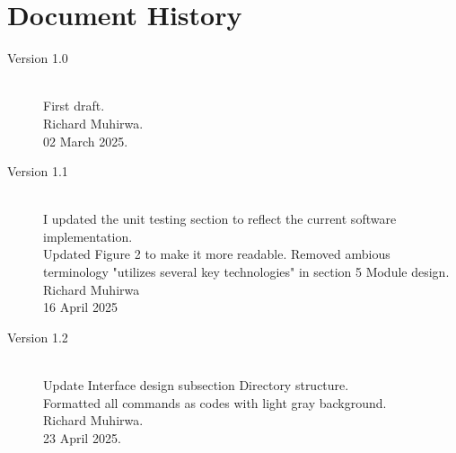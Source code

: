 \documentclass{CSSRforAfrica}
\begin{document}
\newpage

\section*{Document History}

\label{document_history}

\begin{description}

\item [Version 1.0]~\\
First draft. \\
Richard  Muhirwa. \\            
02 March 2025.               

\item [Version 1.1]~\\
I updated the unit testing section to reflect the current software implementation. \\
Updated Figure 2 to make it more readable. 
Removed ambious terminology "utilizes several key technologies" in section 5 Module design.\\
Richard Muhirwa \\
16 April 2025

\item [Version 1.2]~\\
Update Interface design subsection Directory structure.\\
Formatted all commands as codes with light gray background.\\
Richard  Muhirwa. \\                                     
23 April 2025.

\end{description}
\end{document}
